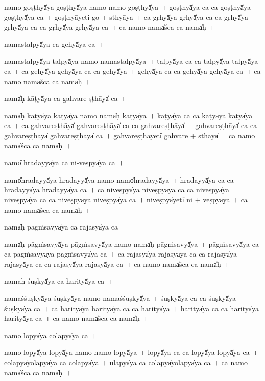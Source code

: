 \documentclass[parskip, DIV=14]{scrartcl}
\begin{document}
{namo॒ goṣṭhyā̍ya॒ goṣṭhyā̍ya॒ namo॒ namo॒ goṣṭhyā̍ya~।
goṣṭhyā̍ya ca ca॒ goṣṭhyā̍ya॒  goṣṭhyā̍ya ca~।
goṣṭhyā॒yeti॒ go + sthyā॒ya॒~।
ca॒ gṛhyā̍ya॒ gṛhyā̍ya ca ca॒ gṛhyā̍ya~।
gṛhyā̍ya ca ca॒  gṛhyā̍ya॒ gṛhyā̍ya ca~।
ca॒ namo॒ nama̍śca ca॒ nama̍ḥ~।

nama॒stalpyā̍ya ca॒ gehyā̍ya ca॒~।

nama॒stalpyā̍ya॒ talpyā̍ya॒ namo॒ nama॒stalpyā̍ya~।
talpyā̍ya ca ca॒ talpyā̍ya॒ talpyā̍ya ca~।
ca॒ gehyā̍ya॒ gehyā̍ya ca ca॒ gehyā̍ya~।
gehyā̍ya ca ca॒ gehyā̍ya॒ gehyā̍ya ca~।
ca॒ namo॒ nama̍śca ca॒ nama̍ḥ~।

nama̍ḥ kā॒ṭyā̍ya ca gahvare॒-ṣṭhāya̍ ca॒~।

nama̍ḥ kā॒ṭyā̍ya kā॒ṭyā̍ya॒ namo॒ nama̍ḥ kā॒ṭyā̍ya~।
kā॒ṭyā̍ya ca ca kā॒ṭyā̍ya kā॒ṭyā̍ya ca~।
ca॒ ga॒hva॒re॒ṣṭhāya̍ gahvare॒ṣṭhāya̍  ca ca gahvare॒ṣṭhāya̍~।                                                                               
ga॒hva॒re॒ṣṭhāya̍ ca ca gahvare॒ṣṭhāya̍ gahvare॒ṣṭhāya̍ ca~। 
ga॒hva॒re॒ṣṭhāyeti̍ gahvare + sthāya̍~।
ca॒ namo॒ nama̍śca ca॒ nama̍ḥ~।

namo̎ hrada॒yyā̍ya ca ni-ve॒ṣpyā̍ya ca॒~।

namo̎hrada॒yyā̍ya hrada॒yyā̍ya॒ namo॒ namo̎hrada॒yyā̍ya~।
hra॒da॒yyā̍ya ca ca hrada॒yyā̍ya hrada॒yyā̍ya ca~।
ca॒ ni॒ve॒ṣpyā̍ya nive॒ṣpyā̍ya ca ca nive॒ṣpyā̍ya~।
ni॒ve॒ṣpyā̍ya ca ca nive॒ṣpyā̍ya nive॒ṣpyā̍ya ca~।
ni॒ve॒ṣpyā̍yeti̍ ni + ve॒ṣpyā̍ya~।
ca॒ namo॒ nama̍śca ca॒ nama̍ḥ~।

nama̍ḥ pāgṁsa॒vyā̍ya ca raja॒syā̍ya ca~।

nama̍ḥ pāgṁsa॒vyā̍ya pāgṁsa॒vyā̍ya॒ namo॒ nama̍ḥ pāgṁsa॒vyā̍ya~।
pā॒gṁ॒sa॒vyā̍ya ca ca pāgṁsa॒vyā̍ya pāgṁsa॒vyā̍ya ca~।
ca॒ ra॒ja॒syā̍ya raja॒syā̍ya ca ca raja॒syā̍ya~।
ra॒ja॒syā̍ya ca ca raja॒syā̍ya raja॒syā̍ya ca~।
ca॒ namo॒ nama̍śca ca॒ nama̍ḥ~।

nama॒ḥ śuṣkyā̍ya ca hari॒tyā̍ya ca॒~।

nama॒śśuṣkyā̍ya॒ śuṣkyā̍ya॒ namo॒ nama॒śśuṣkyā̍ya~।
śuṣkyā̍ya ca ca॒ śuṣkyā̍ya॒ śuṣkyā̍ya ca~।
ca॒ ha॒ri॒tyā̍ya hari॒tyā̍ya ca ca hari॒tyā̍ya~।
ha॒ri॒tyā̍ya ca ca hari॒tyā̍ya hari॒tyā̍ya ca~।
ca॒ namo॒ nama̍śca ca॒ nama̍ḥ~।

namo॒ lopyā̍ya cola॒pyā̍ya ca॒~।

namo॒ lopyā̍ya॒ lopyā̍ya॒ namo॒ namo॒ lopyā̍ya~।
lopyā̍ya ca ca॒ lopyā̍ya॒ lopyā̍ya ca~।
co॒la॒pyā̍yola॒pyā̍ya ca॒ cola॒pyā̍ya~।
u॒la॒pyā̍ya ca cola॒pyā̍yola॒pyā̍ya ca~।
ca॒ namo॒ nama̍śca ca॒ nama̍ḥ~।

}
\end{document}
